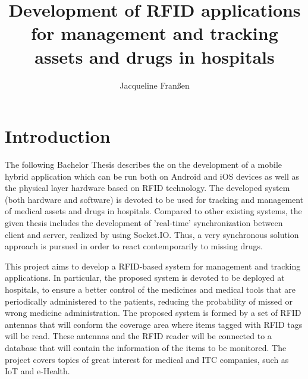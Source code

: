 \documentclass[12pt,a4paper]{book}
\author{Jacqueline Franßen}
\title{Development of RFID applications for management and tracking assets and drugs in hospitals}
\newcommand\BackgroundPic{
\put(70,-40){
\parbox[b][\paperheight]{\paperwidth}{%
\texttt{[image: marca\_agua]}%
}}}
\begin{document}
\pagestyle{bloque_inicial} %


\cleardoublepage
\cleardoublepage
\tableofcontents
\cleardoublepage
{}
\listoffigures
\cleardoublepage
{}
\listoftables

\newtheorem{mydef}{Definition}
\newpage{} %
\pagestyle{doc_body} %

\chapter{\textbf{Introduction}}
The following Bachelor Thesis describes the on the development of a mobile hybrid application which can be run both on Android and iOS devices as well as the physical layer hardware based on RFID technology. The developed system (both hardware and software) is devoted to  be used for tracking and management of medical assets and drugs in hospitals. Compared to other existing systems, the given thesis includes the development of 'real-time' synchronization between client and server, realized by using Socket.IO. Thus, a very synchronous solution approach is pursued in order to react contemporarily to missing drugs.

This project aims to develop a RFID-based system for management and tracking applications. In particular, the proposed system is devoted to be deployed at hospitals, to ensure a better control of the medicines and medical tools that are periodically administered to the patients, reducing the probability of missed or wrong medicine administration. The proposed system is formed by a set of RFID antennas that will conform the coverage area where items tagged with RFID tags will be read. These antennas and the RFID reader will be connected to a database that will contain the information of the items to be monitored. The project covers topics of great interest for medical and \ac{ITC} companies, such as IoT and e-Health.
\end{document}
